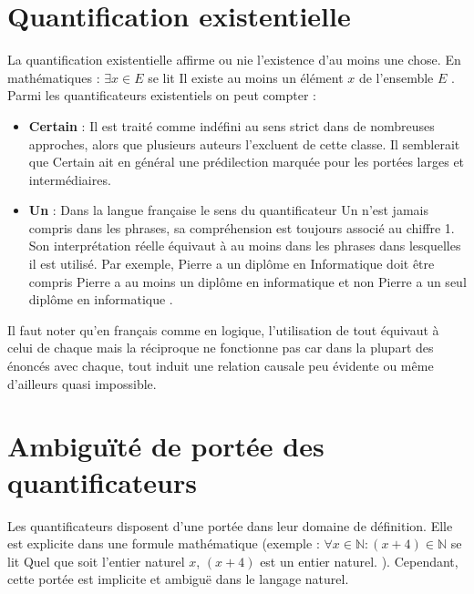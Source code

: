 \documentclass[11pt,letterpaper]{article}
\begin{document}
\section{Quantification existentielle}
    La quantification existentielle affirme ou nie l’existence d’au moins une chose. 
    En mathématiques : \og $\exists x \in E$ \fg{} se lit \og Il existe au moins un élément $x$ de l'ensemble $E$ \fg{}.\\
    Parmi les quantificateurs existentiels on peut compter :
        \begin{itemize}
            \item \textbf{Certain} : Il est traité comme indéfini au sens strict dans de nombreuses approches, alors que plusieurs auteurs l’excluent de cette classe.  %
            Il semblerait que \og Certain \fg{} ait en général une prédilection marquée pour les portées larges et intermédiaires.
            \item \textbf{Un} : Dans la langue française le sens du quantificateur \og Un \fg{} n’est jamais compris dans les phrases, sa compréhension est toujours associé au chiffre 1. Son interprétation réelle équivaut à \og au moins \fg{} dans les phrases dans lesquelles il est utilisé. Par exemple, \og Pierre a un diplôme en Informatique \fg{} doit être compris \og Pierre a au moins un diplôme en informatique \fg{} et non \og Pierre a un seul diplôme en informatique \fg{}.
        \end{itemize}

\vspace{5px}
Il faut noter qu'en français comme en logique, l’utilisation de \og tout \fg{} équivaut à celui de \og chaque \fg{} mais la réciproque ne fonctionne pas car dans la plupart des énoncés avec \og chaque\fg{}, \og tout\fg{} induit une relation causale peu évidente ou même d’ailleurs quasi impossible.\\


\section{Ambiguïté de portée des quantificateurs}

Les quantificateurs disposent d'une portée dans leur domaine de définition. Elle est explicite dans une formule mathématique (exemple : \og $\forall x \in \mathbb{N} : (x+4) \in \mathbb{N}$ \fg{} se lit \og Quel que soit l'entier naturel $x$, $(x+4)$ est un entier naturel. \fg{}). Cependant, cette portée est implicite et ambiguë dans le langage naturel.\\
\end{document}
